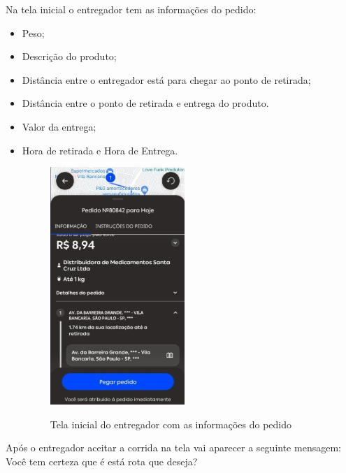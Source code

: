 Na tela inicial o entregador tem as informações do pedido:
\begin{itemize}
    \item Peso;
    \item Descrição do produto;
    \item Distância entre o entregador está para chegar ao ponto de retirada;
    \item Distância entre o ponto de retirada e entrega do produto.
    \item Valor da entrega;
    \item Hora de retirada e Hora de Entrega.
        \begin{figure} [!ht]
            {\centering
             \caption{Tela inicial do entregador com as informações do pedido}
             \includegraphics[width=0.5\linewidth]{figuras/infopedido.png}
             \label{fig:enter-label}
            }
        \end{figure}

\end{itemize}

\begin{itemize}
Após o entregador aceitar a corrida na tela vai aparecer a seguinte mensagem:
Você tem certeza que é está rota que deseja?
\end{itemize}

